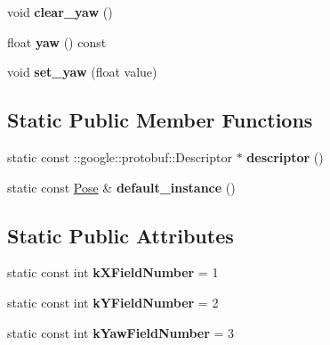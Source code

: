 \begin{DoxyCompactItemize}
\item 
void {\bfseries clear\+\_\+yaw} ()\hypertarget{classvss__state_1_1Pose_adaf3f1567e367b89722e45b4bcc8bff6}{}\label{classvss__state_1_1Pose_adaf3f1567e367b89722e45b4bcc8bff6}

\item 
float {\bfseries yaw} () const \hypertarget{classvss__state_1_1Pose_a0b8e24e17a194af015f54ee616f583ab}{}\label{classvss__state_1_1Pose_a0b8e24e17a194af015f54ee616f583ab}

\item 
void {\bfseries set\+\_\+yaw} (float value)\hypertarget{classvss__state_1_1Pose_a7ec9dc6ed0302298048cd803e96b6ca3}{}\label{classvss__state_1_1Pose_a7ec9dc6ed0302298048cd803e96b6ca3}

\end{DoxyCompactItemize}
\subsection*{Static Public Member Functions}
\begin{DoxyCompactItemize}
\item 
static const \+::google\+::protobuf\+::\+Descriptor $\ast$ {\bfseries descriptor} ()\hypertarget{classvss__state_1_1Pose_a6423cf6dd9db285c52d1bb4e10e1a24c}{}\label{classvss__state_1_1Pose_a6423cf6dd9db285c52d1bb4e10e1a24c}

\item 
static const \hyperlink{classvss__state_1_1Pose}{Pose} \& {\bfseries default\+\_\+instance} ()\hypertarget{classvss__state_1_1Pose_a6d403e8d406ba3fd0403662cf8883fcc}{}\label{classvss__state_1_1Pose_a6d403e8d406ba3fd0403662cf8883fcc}

\end{DoxyCompactItemize}
\subsection*{Static Public Attributes}
\begin{DoxyCompactItemize}
\item 
static const int {\bfseries k\+X\+Field\+Number} = 1\hypertarget{classvss__state_1_1Pose_a55da0ea3762949322b44da8206bb84f0}{}\label{classvss__state_1_1Pose_a55da0ea3762949322b44da8206bb84f0}

\item 
static const int {\bfseries k\+Y\+Field\+Number} = 2\hypertarget{classvss__state_1_1Pose_a0a2f401726b1453c65cbaa99fde61b4e}{}\label{classvss__state_1_1Pose_a0a2f401726b1453c65cbaa99fde61b4e}

\item 
static const int {\bfseries k\+Yaw\+Field\+Number} = 3\hypertarget{classvss__state_1_1Pose_a4f1b9b7cb0a470421a29a733329a7e7c}{}\label{classvss__state_1_1Pose_a4f1b9b7cb0a470421a29a733329a7e7c}

\end{DoxyCompactItemize}
